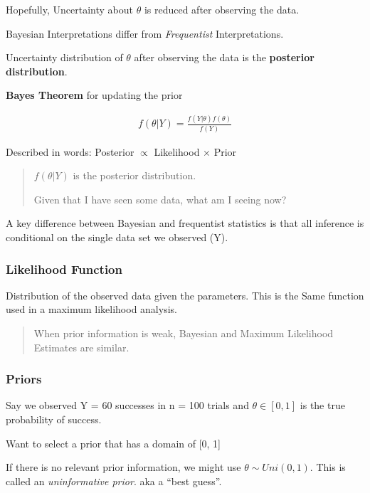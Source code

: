 \documentclass[11pt]{article}
\begin{document}
Hopefully, Uncertainty about \(\theta\) is reduced after observing the data.

Bayesian Interpretations differ from \emph{Frequentist} Interpretations.

Uncertainty distribution of \(\theta\) after observing the data is the \textbf{posterior
distribution}.

\textbf{Bayes Theorem} for updating the prior

\begin{equation}
\begin{split}
f(\theta | Y) = \frac{f(Y | \theta) f(\theta)}{f(Y)}
\end{split}
\end{equation}

Described in words: Posterior \(\propto\) Likelihood \(\times\) Prior

\begin{quote}
\(f(\theta | Y)\) is the posterior distribution.

Given that I have seen some data, what am I seeing now?
\end{quote}

A key difference between Bayesian and frequentist statistics is that all
inference is conditional on the single data set we observed (Y).



\subsubsection{Likelihood Function}
\label{sec:org31e794b}

Distribution of the observed data given the parameters. This is the Same
function used in a maximum likelihood analysis.

\begin{quote}
When prior information is weak, Bayesian and Maximum Likelihood Estimates are similar.
\end{quote}

\subsubsection{Priors}
\label{sec:org84f5547}

Say we observed Y = 60 successes in n = 100 trials and \(\theta \in [0,1]\) is the
true probability of success.

Want to select a prior that has a domain of [0, 1]

If there is no relevant prior information, we might use \(\theta \sim Uni(0,1)\).
This is called an \emph{uninformative prior}. aka a ``best guess''.
\end{document}
